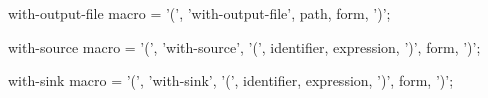 \begin{optDefinition}
\Syntax
\savesyntax\withoutputfileSyntax\vbox{\small\syntax
with-output-file macro
   = '(', 'with-output-file', path,  {form}, ')';
\endsyntax}


\Syntax
\savesyntax\withoutputfileSyntax\vbox{\small\syntax
with-source macro
   = '(', 'with-source',
          '(', identifier, expression, ')', {form}, ')';
\endsyntax}

\Syntax
\savesyntax\withoutputfileSyntax\vbox{\small\syntax
with-sink macro
   = '(', 'with-sink',
          '(', identifier, expression, ')', {form}, ')';
\endsyntax}

\end{optDefinition}
%
